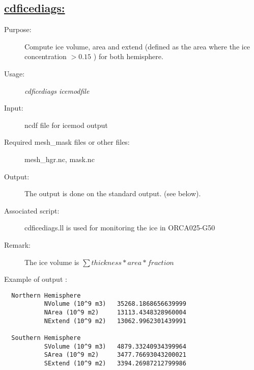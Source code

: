 \documentclass[a4paper,11pt]{article}
\begin{document}
\subsection*{\underline{cdficediags:}}
\begin{description}
\item[Purpose:]  Compute ice volume, area and extend (defined as the area where the ice concentration $> 0.15$ ) for
both hemisphere.
\item[Usage:] {\em cdficediags  icemodfile }\\
\item[Input:]  ncdf file for icemod output
\item[Required mesh\_mask files or other files:]  mesh\_hgr.nc, mask.nc
\item[Output:] The output is done on the standard output. (see below).
\item[Associated script:] cdficediags.ll  is used for monitoring the ice in ORCA025-G50
\item[Remark:]  The ice volume is $\sum thickness * area * fraction $
\end{description}
Example of output : 
\begin{verbatim}
  Northern Hemisphere
           NVolume (10^9 m3)   35268.1868656639999
           NArea (10^9 m2)     13113.4348328960004
           NExtend (10^9 m2)   13062.9962301439991

  Southern Hemisphere
           SVolume (10^9 m3)   4879.33240934399964
           SArea (10^9 m2)     3477.76693043200021
           SExtend (10^9 m2)   3394.26987212799986
\end{verbatim}

\newpage
\end{document}
